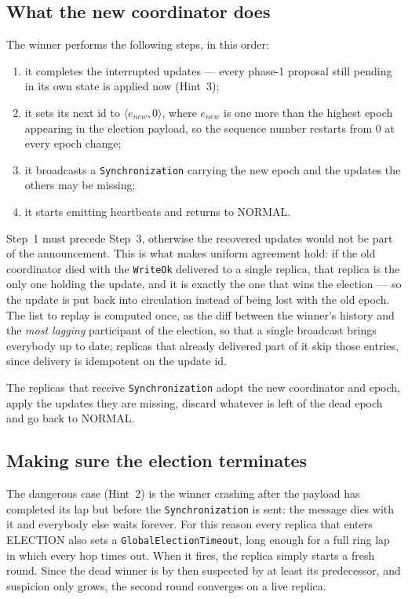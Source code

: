 \subsection*{What the new coordinator does}

The winner performs the following steps, in this order:

\begin{enumerate}[nosep]
\item it completes the interrupted updates --- every phase-1 proposal still pending in its own state is applied now (Hint~3);
\item it sets its next id to $\langle e_{new}, 0\rangle$, where $e_{new}$ is one more than the highest epoch appearing in the election payload, so the sequence number restarts from $0$ at every epoch change;
\item it broadcasts a \texttt{Synchronization} carrying the new epoch and the updates the others may be missing;
\item it starts emitting heartbeats and returns to NORMAL.
\end{enumerate}

Step~1 must precede Step~3, otherwise the recovered updates would not be part of the announcement. This is what makes uniform agreement hold: if the old coordinator died with the \texttt{WriteOk} delivered to a single replica, that replica is the only one holding the update, and it is exactly the one that wins the election --- so the update is put back into circulation instead of being lost with the old epoch. The list to replay is computed once, as the diff between the winner's history and the \emph{most lagging} participant of the election, so that a single broadcast brings everybody up to date; replicas that already delivered part of it skip those entries, since delivery is idempotent on the update id.

The replicas that receive \texttt{Synchronization} adopt the new coordinator and epoch, apply the updates they are missing, discard whatever is left of the dead epoch and go back to NORMAL.

\subsection*{Making sure the election terminates}

The dangerous case (Hint~2) is the winner crashing after the payload has completed its lap but before the \texttt{Synchronization} is sent: the message dies with it and everybody else waits forever. For this reason every replica that enters ELECTION also sets a \texttt{GlobalElectionTimeout}, long enough for a full ring lap in which every hop times out. When it fires, the replica simply starts a fresh round. Since the dead winner is by then suspected by at least its predecessor, and suspicion only grows, the second round converges on a live replica.

